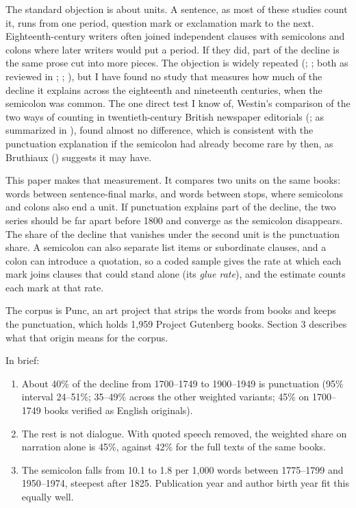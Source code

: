 \documentclass[
  11pt,
]{article}
\providecommand{\tightlist}{%
  \setlength{\itemsep}{0pt}\setlength{\parskip}{0pt}}
\begin{document}
The standard objection is about units. A sentence, as most of these studies count it, runs from one period, question mark or exclamation mark to the next. Eighteenth-century writers often joined
independent clauses with semicolons and colons where later writers would put a period. If they did, part of the decline is the same prose cut into more pieces. The objection is widely repeated
(; ; both as reviewed in ; ; ), but I have found no study that measures how much of the decline it explains across the eighteenth and nineteenth centuries, when the semicolon was
common. The one direct test I know of, Westin's comparison of the two ways of counting in twentieth-century British newspaper editorials (; as summarized in
), found almost no difference, which is consistent with the punctuation explanation if the semicolon had already become rare by then, as Bruthiaux
() suggests it may have.

This paper makes that measurement. It compares two units on the same books: words between sentence-final marks, and words between stops, where semicolons and colons also end a unit. If punctuation
explains part of the decline, the two series should be far apart before 1800 and converge as the semicolon disappears. The share of the decline that vanishes under the second unit is the punctuation
share. A semicolon can also separate list items or subordinate clauses, and a colon can introduce a quotation, so a coded sample gives the rate at which each mark joins clauses that could stand alone
(its \emph{glue rate}), and the estimate counts each mark at that rate.

The corpus is Punc, an art project that strips the words from books and keeps the punctuation, which holds 1,959 Project Gutenberg books. Section 3 describes what that origin means for the corpus.

In brief:

\begin{enumerate}
\def\labelenumi{\arabic{enumi}.}
\tightlist
\item
  About 40\% of the decline from 1700--1749 to 1900--1949 is punctuation (95\% interval 24--51\%; 35--49\% across the other weighted variants; 45\% on 1700--1749 books verified as English originals).
\item
  The rest is not dialogue. With quoted speech removed, the weighted share on narration alone is 45\%, against 42\% for the full texts of the same books.
\item
  The semicolon falls from 10.1 to 1.8 per 1,000 words between 1775--1799 and 1950--1974, steepest after 1825. Publication year and author birth year fit this equally well.
\end{enumerate}
\end{document}
